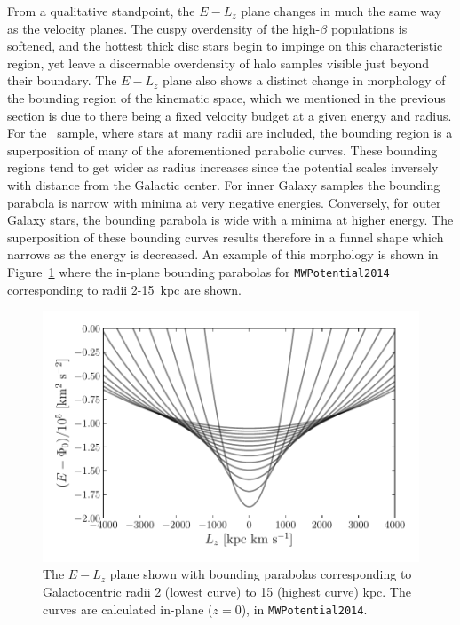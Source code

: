 From a qualitative standpoint, the $E-L_{z}$ plane changes in much the same way as the velocity planes. The cuspy overdensity of the high-$\beta$ populations is softened, and the hottest thick disc stars begin to impinge on this characteristic region, yet leave a discernable overdensity of halo samples visible just beyond their boundary. The $E-L_{z}$ plane also shows a distinct change in morphology of the bounding region of the kinematic space, which we mentioned in the previous section is due to there being a fixed velocity budget at a given energy and radius. For the \survey\ sample, where stars at many radii are included, the bounding region is a superposition of many of the aforementioned parabolic curves. These bounding regions tend to get wider as radius increases since the potential scales inversely with distance from the Galactic center. For inner Galaxy samples the bounding parabola is narrow with minima at very negative energies. Conversely, for outer Galaxy stars, the bounding parabola is wide with a minima at higher energy. The superposition of these bounding curves results therefore in a funnel shape which narrows as the energy is decreased. An example of this morphology is shown in Figure~\ref{fig:ELzBoundaries} where the in-plane bounding parabolas for \texttt{MWPotential2014} corresponding to radii 2-15~kpc are shown.

\begin{figure}
    \centering
    \includegraphics[width=\columnwidth]{figure/ch2/ELzBoundingParabolas.pdf}
    \caption{The $E-L_{z}$ plane shown with bounding parabolas corresponding to Galactocentric radii 2 (lowest curve) to 15 (highest curve) kpc. The curves are calculated in-plane ($z=0$), in \texttt{MWPotential2014}.}
    \label{fig:ELzBoundaries}
\end{figure}

